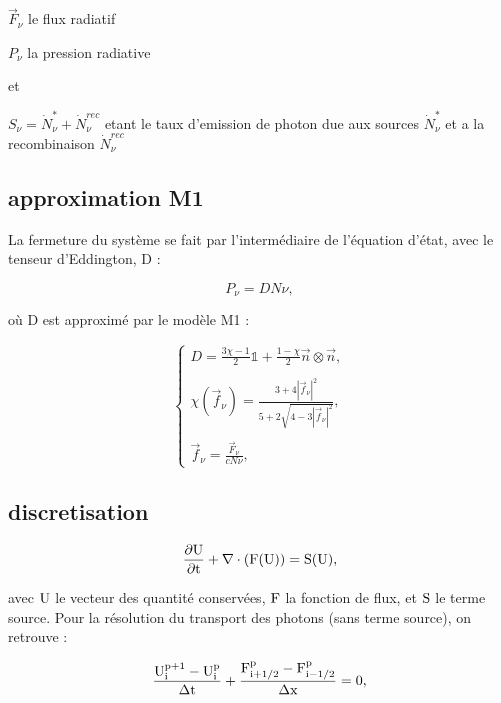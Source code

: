 $\vec{F}_\nu$ le flux radiatif

$P_\nu $ la pression radiative

et 

$S_\nu = \dot{N}_\nu^* + \dot{N}_\nu^{rec}$ etant le taux d'emission de photon due aux sources $\dot{N}_\nu^*$ et a la recombinaison $ \dot{N}_\nu^{rec}$


\subsection{approximation M1}
La fermeture du système se fait par l’intermédiaire de l’équation
d’état, avec le tenseur d’Eddington, D :

\begin{equation}
 P_\nu = D N\nu ,
\label{eq:fermeture}
\end{equation}

où D est approximé par le modèle M1 \citep{levermore1984,gonzalez2005} :

\begin{equation}
\begin{cases}

D = \frac{ 3\chi -1 }{2} \mathbb{1} + \frac{ 1 - \chi }{2} \vec{n} \otimes \vec{n} , \\
\\
\chi(\vec{f}_\nu) = \frac{ 3+4 |\vec{f}_\nu|^2 }{5+2\sqrt{4-3|\vec{f}_\nu|^2}} , \\
\\
\vec{f}_\nu = \frac{ \vec{F}_\nu }{c N\nu }  ,

\end{cases}
\label{eq:tenseur}
\end{equation}

\subsection{discretisation}
\begin{equation}
\rm{ \frac{\partial U}{\partial t} + \nabla \cdot (F(U)) = S(U), }
\label{eq:rad_generale}
\end{equation}

avec $\rm{U}$ le vecteur des quantité conservées, $\rm{F}$ la fonction de flux, et $\rm{S}$ le terme source. Pour la résolution du transport des photons (sans terme source), on retrouve :

\begin{equation}
\rm{ \frac{ U^{p+1}_i - U^{p}_i }{\Delta t} + \frac{ F^{p}_{i
+1/2} - F^{p}_{i-1/2} }{\Delta x} =0,}
\label{eq:rad_solver}
\end{equation}

